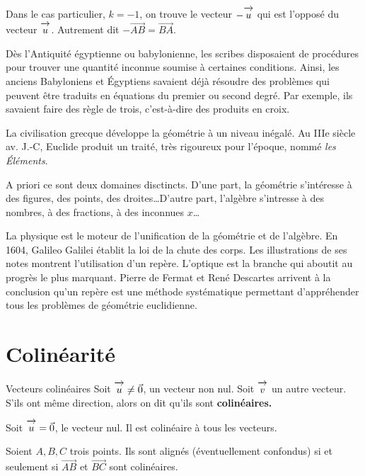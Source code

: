 \documentclass[10pt,a4paper,openany,twoside,prof]{book}
\begin{document}
\begin{rem}{}{}
	Dans le cas particulier, $k=-1$, on trouve le vecteur $-\overrightarrow{\,\mathstrut u\,}$ qui est l'opposé du vecteur $\overrightarrow{\,\mathstrut u\,}$. Autrement dit $-\vec{AB}=\vec{BA}$.
\end{rem}

\begin{histoire}{}{}
	Dès l'Antiquité égyptienne ou babylonienne, les scribes disposaient de procédures pour trouver une quantité inconnue soumise à certaines conditions. Ainsi, les anciens Babyloniens et Égyptiens savaient déjà résoudre des problèmes qui peuvent être traduits en équations du premier ou second degré. Par exemple, ils savaient faire des règle de trois, c'est-à-dire des produits en croix.

	La civilisation grecque développe la géométrie à un niveau inégalé. Au IIIe siècle av. J.-C, Euclide produit un traité, très rigoureux pour l'époque, nommé \textit{les Éléments}.

	A priori ce sont deux domaines disctincts. D'une part, la géométrie s'intéresse à des figures, des points, des droites\dots D'autre part, l'algèbre s'intresse à des nombres, à des fractions, à des inconnues $x$\dots

  La physique est le moteur de l'unification de la géométrie et de l'algèbre. En 1604, Galileo Galilei établit la loi de la chute des corps. Les illustrations de ses notes montrent l'utilisation d'un repère. L'optique est la branche qui aboutit au progrès le plus marquant. Pierre de Fermat et René Descartes arrivent à la conclusion qu'un repère est une méthode systématique permettant d'appréhender tous les problèmes de géométrie euclidienne.
\end{histoire}

\section{Colinéarité}
\begin{defi}{Vecteurs colinéaires}{}
	Soit $\overrightarrow{\,\mathstrut u\,}\ne\vec{0}$, un vecteur non nul. Soit $\overrightarrow{\,\mathstrut v\,}$ un autre vecteur. S'ils ont même direction, alors on dit qu'ils sont \bf{colinéaires}.

	Soit $\overrightarrow{\,\mathstrut u\,}=\vec{0}$, le vecteur nul. Il est colinéaire à tous les vecteurs.
\end{defi}

\begin{prop}{}{}
	Soient $A, B, C$ trois points. Ils sont alignés (éventuellement confondus) si et seulement si $\vec{AB}$ et $\vec{BC}$ sont colinéaires.
\end{prop}
\end{document}
